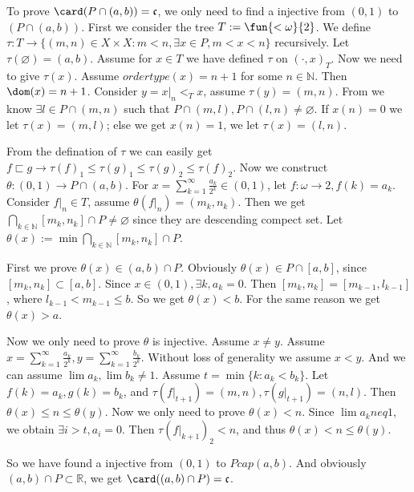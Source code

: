 \documentclass{ctexart}
\begin{document}
\begin{solution}
  To prove \(\card(P \cap(a,b))=\mathfrak{c}\), we only need to find a injective from \((0,1)\) to \((P \cap (a,b)) \). 
  First we consider the tree \(T:=\fun{<\omega}{2}\). We define \(\tau:T \to \{(m,n) \in X \times X:m<n,\exists x \in P,m<x<n\}\) recursively. 
  Let \(\tau(\varnothing)=(a,b)\). Assume for \(x \in T\) we have defined \(\tau\) on \((\cdot,x)_T\). Now we need to give \(\tau(x)\). 
  Assume \(ordertype(x)=n+1\) for some \(n \in \mathbb{N}\). Then \(\dom(x)=n+1\). 
  Consider \(y=x|_{n} <_T x\), assume \(\tau(y)=(m,n)\). 
  From  we know \(\exists l \in P \cap (m,n)\) such that \(P \cap (m,l),P \cap (l,n) \neq \varnothing\). 
  If \(x(n)=0\) we let \(\tau(x)=(m,l)\); else we get \(x(n)=1\), we let \(\tau(x)=(l,n)\). 

  From the defination of \(\tau\) we can easily get \(f \sqsubset g \to \tau(f)_1 \leq \tau(g)_1 \leq \tau(g)_2 \leq \tau(f)_2\). 
  Now we construct \(\theta:(0,1) \to P \cap (a,b)\). For \(x=\sum_{k=1}^{\infty} \frac{a_k}{2^k} \in (0,1)\), let \(f:\omega \to 2,f(k)=a_k\). 
  Consider \(f|_{n} \in T\), assume \(\theta(f|_{n})=(m_k,n_k)\). 
  Then we get \(\bigcap_{k \in \mathbb{N}} [m_k,n_k]\cap P \neq \varnothing\) since they are descending compect set. 
  Let \(\theta(x):= \min \bigcap_{k \in \mathbb{N}} [m_k,n_k]\cap P\). 

  First we prove \(\theta(x) \in (a,b) \cap P\). Obviously \(\theta(x) \in P \cap [a,b]\), since \([m_k,n_k] \subset [a,b]\). 
  Since \(x \in (0,1),\exists k,a_k =0\). Then \([m_k,n_k]= [m_{k-1},l_{k-1}]\), where \(l_{k-1}<m_{k-1} \leq b\). 
  So we get \(\theta(x)<b\). For the same reason we get \(\theta(x)>a\). 

  Now we only need to prove \(\theta\) is injective. Assume \(x \neq y\). 
  Assume \(x=\sum_{k=1}^{\infty} \frac{a_k}{2^k},y=\sum_{k=1}^{\infty} \frac{b_k}{2^k}\). Without loss of generality we assume \(x<y\). 
  And we can assume \(\lim a_k,\lim b_k \neq 1\). Assume \(t=\min\{k:a_k<b_k\}\). 
  Let \(f(k)=a_k,g(k)=b_k\), and \(\tau(f|_{t+1})=(m,n),\tau(g|_{t+1})=(n,l)\). 
  Then \(\theta(x) \leq n \leq \theta(y)\). Now we only need to prove \(\theta(x)<n\). 
  Since \(\lim a_k neq 1\), we obtain \(\exists i>t,a_i=0\). Then \(\tau(f|_{k+1})_2<n\), and thus \(\theta(x)<n \leq \theta(y)\). 

  So we have found a injective from \((0,1)\) to \(P cap (a,b)\). And obviously \((a,b) \cap P \subset \mathbb{R}\), we get \(\card((a,b) \cap P)=\mathfrak{c}\). 
\end{solution}
\end{document}
